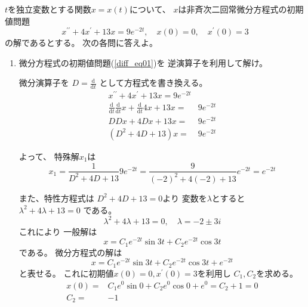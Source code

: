 \documentclass[12pt,b5paper]{ltjsarticle}
\begin{document}
\hrulefill


$t$を独立変数とする関数$x=x(t)$について、
$x$は非斉次二回常微分方程式の初期値問題
\begin{equation}
 x^{\prime\prime} + 4x^{\prime} + 13x = 9e^{-2t}
  ,\quad
  x(0)=0
  ,\quad
  x^{\prime}(0)=3
  \label{diff_eq01}
\end{equation}
の解であるとする。
次の各問に答えよ。
\begin{enumerate}
 \item
      微分方程式の初期値問題(\ref{diff_eq01})を
      逆演算子を利用して解け。

      \dotfill

      微分演算子を
      $D=\frac{\mathrm{d}}{\mathrm{d}t}$
      として方程式を書き換える。
      \begin{align}
       x^{\prime\prime} + 4x^{\prime} + 13x = 9e^{-2t}\\
       \frac{\mathrm{d}}{\mathrm{d}t}\frac{\mathrm{d}}{\mathrm{d}t}x
       +\frac{\mathrm{d}}{\mathrm{d}t}4x
       +13x =& 9e^{-2t}\\
       DDx+4Dx+13x =& 9e^{-2t}\\
       (D^2+4D+13)x =& 9e^{-2t}
      \end{align}

      よって、
      特殊解$x_1$は
      \begin{equation}
       x_1=
        \frac{1}{D^2+4D+13}9e^{-2t}
        =
        \frac{9}{(-2)^2+4(-2)+13}e^{-2t}
        =e^{-2t}
      \end{equation}

      また、特性方程式は
      $D^2+4D+13=0$より
      変数を$\lambda$とすると
      $\lambda^2+4\lambda+13 = 0$
      である。
      \begin{equation}
       \lambda^2+4\lambda+13 = 0
        ,\quad
        \lambda = -2 \pm 3i
      \end{equation}
      これにより
      一般解は
      \begin{equation}
       x = C_1 e^{- 2t} \sin{3t} + C_2 e^{- 2t} \cos{3t}
      \end{equation}
      である。
      微分方程式の解は
      \begin{equation}
       x = C_1 e^{- 2t} \sin{3t} + C_2 e^{- 2t} \cos{3t} + e^{-2t}
        \label{sol_eq}
      \end{equation}
      と表せる。
      これに初期値$x(0)=0,x^{\prime}(0)=3$を利用し
      $C_1,C_2$を求める。
      \begin{align}
       x(0)
       =& C_1 e^{0} \sin{0} + C_2 e^{0} \cos{0} + e^{0}
       = C_2 + 1 = 0\\
       C_2 =& - 1
      \end{align}


\end{enumerate}
\end{document}
